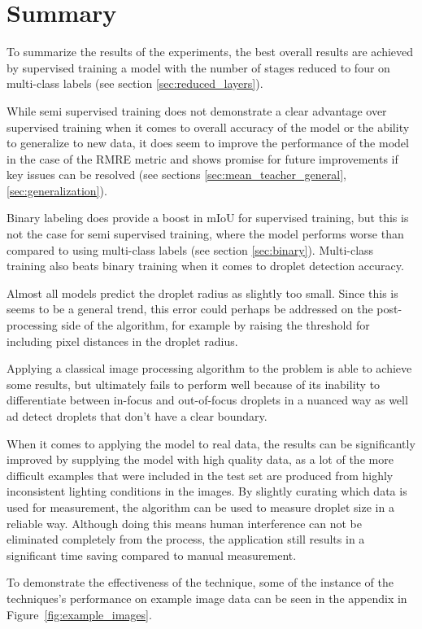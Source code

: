 \section{Summary}

To summarize the results of the experiments, the best overall results are achieved by supervised training a model with the number of stages reduced to four on multi-class labels (see section \ref{sec:reduced_layers}).

While semi supervised training does not demonstrate a clear advantage over supervised training when it comes to overall accuracy of the model or the ability to generalize to new data, it does seem to improve the performance of the model in the case of the RMRE metric and shows promise for future improvements if key issues can be resolved (see sections \ref{sec:mean_teacher_general}, \ref{sec:generalization}).

Binary labeling does provide a boost in mIoU for supervised training, but this is not the case for semi supervised training, where the model performs worse than compared to using multi-class labels (see section \ref{sec:binary}).
Multi-class training also beats binary training when it comes to droplet detection accuracy.

Almost all models predict the droplet radius as slightly too small. Since this is seems to be a general trend, this error could perhaps be addressed on the post-processing side of the algorithm, for example by raising the threshold for including pixel distances in the droplet radius.

Applying a classical image processing algorithm to the problem is able to achieve some results, but ultimately fails to perform well because of its inability to differentiate between in-focus and out-of-focus droplets in a nuanced way as well ad detect droplets that don't have a clear boundary.

When it comes to applying the model to real data, the results can be significantly improved by supplying the model with high quality data, as a lot of the more difficult examples that were included in the test set are produced from highly inconsistent lighting conditions in the images.
By slightly curating which data is used for measurement, the algorithm can be used to measure droplet size in a reliable way.
Although doing this means human interference can not be eliminated completely from the process, the application still results in a significant time saving compared to manual measurement.

To demonstrate the effectiveness of the technique, some of the instance of the techniques's performance on example image data can be seen in the appendix in Figure~\ref{fig:example_images}.